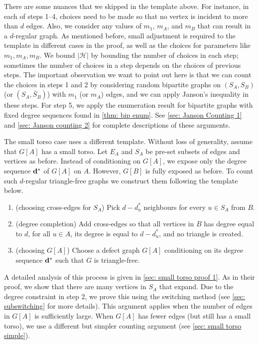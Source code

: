\documentclass[11pt]{article}
\theoremstyle{plain}
\begin{document}
There are some nuances that we skipped in the template above. For instance, in each of steps 1--4, choices need to be made so that no vertex is incident to more than $d$ edges. Also, we consider any values of $m_1$, $m_A$, and $m_B$ that can result in a $d$-regular graph. As mentioned before, small adjustment is required to the template in different cases in the proof, as well as the choices for parameters like $m_1,m_A,m_B$. 
We bound $|{\mathcal H}|$ by bounding the number of choices in each step; sometimes the number of choices in a step depends on the choices of previous steps.
The important observation we want to point out here is that we can count the choices in steps 1 and 2 by considering random bipartite graphs on $(S_A,S_B)$ (or $(S_A,\bar S_B)$) with $m_1$ (or $m_A$) edges, and we can apply Janson's inequality in these steps. For step 5, we apply the enumeration result for bipartite graphs with fixed degree sequences found in \cref{thm: bip enum}. See \cref{sec: Janson Counting 1} and \cref{sec: Janson counting 2} for complete descriptions of these arguments.




The small torso case uses a different template. Without loss of generality, assume that $G[A]$ has a small torso. Let $E_A$ and $S_A$ be pre-set subsets of edges and vertices as before. Instead of conditioning on $G[A]$, we expose only the degree sequence ${\bf d}^*$ of $G[A]$ on $A$. However, $G[B]$ is fully exposed as before. To count such $d$-regular triangle-free graphs we construct them following the template below.
\begin{enumerate}
    \item (choosing cross-edges for $S_A$) Pick $d-d^*_u$ neighbours for every $u\in S_A$ from $B$.
    \item (degree completion) Add cross-edges so that all vertices in $B$ has degree equal to $d$, for all $u\in A$, its degree is equal to $d-d^*_u$, and no triangle is created.
    \item (choosing $G[A]$) Choose a defect graph $G[A]$ conditioning on its degree sequence ${\bf d}^*$ such that $G$ is triangle-free.
\end{enumerate}

A detailed analysis of this process is given in \cref{sec: small torso proof 1}. As in their proof, we show that there are many vertices in $S_A$ that expand.  Due to the degree constraint in step 2, we prove this using the switching method (see \cref{sec: subswitching} for more details). This argument applies when the number of edges in $G[A]$ is sufficiently large. When $G[A]$ has fewer edges (but still has a small torso), we use a different but simpler counting argument (see \cref{sec: small torso simple}).
\end{document}
